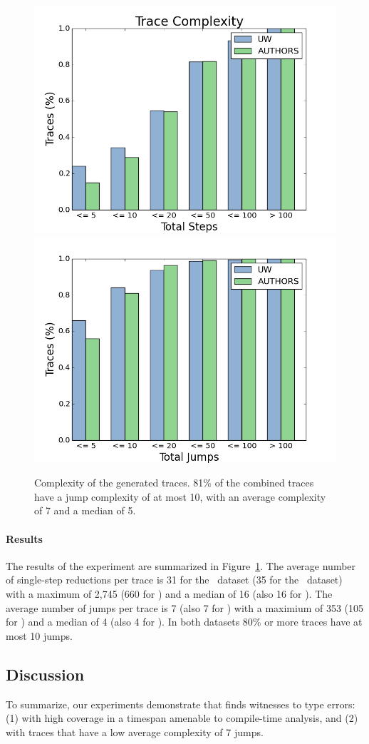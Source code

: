 %
\begin{figure}[t]
\centering
\includegraphics[width=0.49\linewidth]{trace_size_step.png}
\includegraphics[width=0.49\linewidth]{trace_size_jump.png}
\caption{Complexity of the generated traces. 81\% of the combined traces
  have a jump complexity of at most 10, with an average complexity of 7
  and a median of 5.}
\label{fig:results-complexity}
\end{figure}
%

\paragraph{Results}
\label{sec:results-complexity}
The results of the experiment are summarized in
Figure~\ref{fig:results-complexity}.
%
The average number of single-step reductions per trace is 31 for the
\ucsdbench\ dataset (35 for the \uwbench\ dataset) with a maximum of
2,745 (660 for \uwbench) and a median of 16 (also 16 for \uwbench).
%
The average number of jumps per trace is 7 (also 7 for \uwbench) with a
maximium of 353 (105 for \uwbench) and a median of 4 (also 4 for
\uwbench).
%
In both datasets 80\% or more traces have at most 10 jumps.
%

\subsection{Discussion}
\label{sec:discussion}

To summarize, our experiments demonstrate that \nanomaly finds witnesses
to type errors: (1) with high coverage in a timespan amenable to
compile-time analysis, and (2) with traces that have a low average
complexity of 7 jumps.

